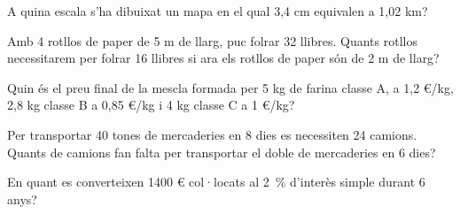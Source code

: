 \begin{autoaval}{46}
\begin{mylist}
\exer[2]  A quina escala s'ha dibuixat un mapa en el qual 3,4 cm
equivalen a 1,02 km?

\exer[2]  Amb 4 rotllos de paper de 5 m de llarg, puc folrar 32
llibres. Quants rotllos necessitarem per folrar 16 llibres si ara els
rotllos de paper són de 2 m de llarg?

\exer[2]  
Quin és el preu final de la mescla formada per 5 kg de farina classe A,
a 1,2 \euro{}/kg, 2,8 kg classe B a 0,85 \euro{}/kg i 4 kg classe C a 1
\euro{}/kg?

\exer[2]  Per transportar 40 tones de mercaderies en 8 dies es
necessiten 24 camions. Quants de camions fan falta per transportar el
doble de mercaderies en 6 dies?
 

\exer[2] En quant es converteixen 1400 \euro{} col·locats al 2~\% d'interès simple durant 6 anys?

\end{mylist}
\end{autoaval}



